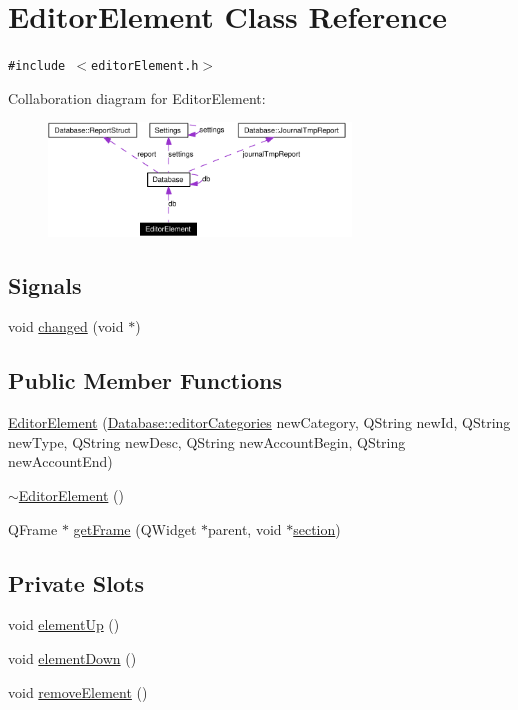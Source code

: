 \hypertarget{classEditorElement}{
\section{Editor\-Element Class Reference}
\label{classEditorElement}
}
{\tt \#include $<$editor\-Element.h$>$}

Collaboration diagram for Editor\-Element:\begin{figure}[H]
\begin{center}
\leavevmode
\includegraphics[width=228pt]{classEditorElement__coll__graph}
\end{center}
\end{figure}
\subsection*{Signals}
\begin{CompactItemize}
\item 
void \hyperlink{classEditorElement_l0}{changed} (void $\ast$)
\end{CompactItemize}
\subsection*{Public Member Functions}
\begin{CompactItemize}
\item 
\hyperlink{classEditorElement_a0}{Editor\-Element} (\hyperlink{classDatabase_w8}{Database::editor\-Categories} new\-Category, QString new\-Id, QString new\-Type, QString new\-Desc, QString new\-Account\-Begin, QString new\-Account\-End)
\item 
\hyperlink{classEditorElement_a1}{$\sim$Editor\-Element} ()
\item 
QFrame $\ast$ \hyperlink{classEditorElement_a2}{get\-Frame} (QWidget $\ast$parent, void $\ast$\hyperlink{classEditorElement_r1}{section})
\end{CompactItemize}
\subsection*{Private Slots}
\begin{CompactItemize}
\item 
void \hyperlink{classEditorElement_k0}{element\-Up} ()
\item 
void \hyperlink{classEditorElement_k1}{element\-Down} ()
\item 
void \hyperlink{classEditorElement_k2}{remove\-Element} ()
\end{CompactItemize}
